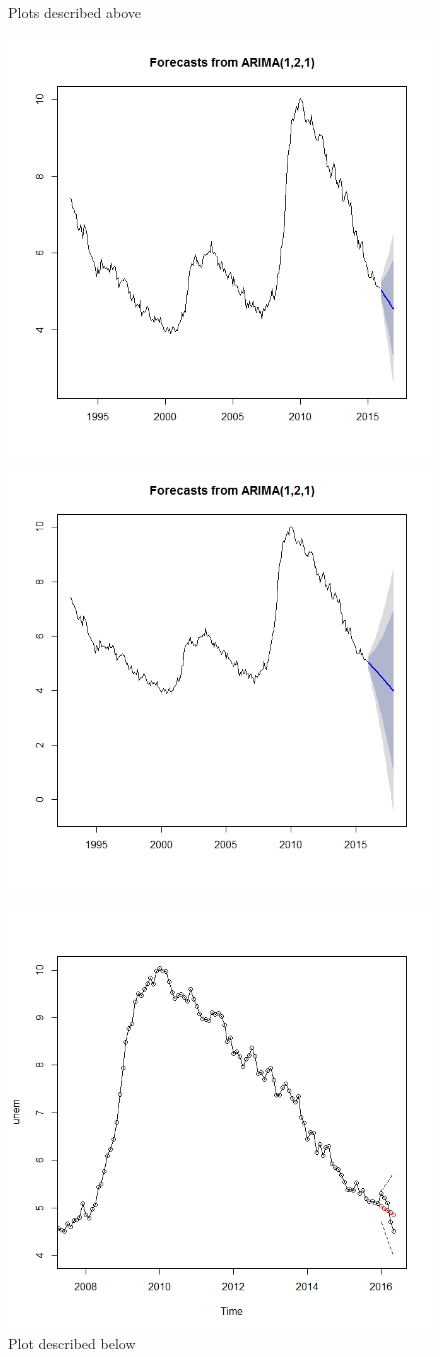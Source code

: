 \documentclass[twoside,twocolumn]{article}
\begin{document}
  \begin{figure}[htb]
    	\centering
     	\caption{Plots described above}
     	\includegraphics[width=.8\linewidth]{images/fore5}
     	\includegraphics[width=.7\linewidth]{images/fore6}
     	\caption{Plot described below}
     	\includegraphics[width=.7\linewidth]{images/fore7}
 \end{figure}
 
\end{document}
